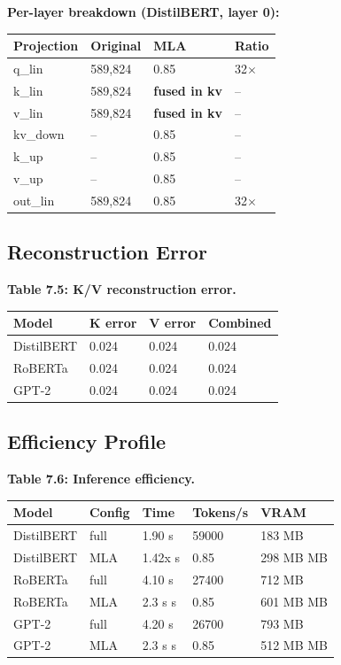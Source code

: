 \textbf{Per-layer breakdown (DistilBERT, layer 0):}

\begin{table}[H]
\centering
\small
\begin{tabular}{llll}
\toprule
\textbf{Projection} & \textbf{Original} & \textbf{MLA} & \textbf{Ratio} \\
\midrule
q\_lin & 589,824 & 0.85 & 32$\times$ \\
k\_lin & 589,824 & \textbf{fused in kv} & -- \\
v\_lin & 589,824 & \textbf{fused in kv} & -- \\
kv\_down & -- & 0.85 & -- \\
k\_up & -- & 0.85 & -- \\
v\_up & -- & 0.85 & -- \\
out\_lin & 589,824 & 0.85 & 32$\times$ \\
\bottomrule
\end{tabular}
\end{table}

\subsection{Reconstruction Error}

\textbf{Table 7.5: K/V reconstruction error.}

\begin{table}[H]
\centering
\small
\begin{tabular}{llll}
\toprule
\textbf{Model} & \textbf{K error} & \textbf{V error} & \textbf{Combined} \\
\midrule
DistilBERT & 0.024 & 0.024 & 0.024 \\
RoBERTa & 0.024 & 0.024 & 0.024 \\
GPT-2 & 0.024 & 0.024 & 0.024 \\
\bottomrule
\end{tabular}
\end{table}

\subsection{Efficiency Profile}

\textbf{Table 7.6: Inference efficiency.}

\begin{table}[H]
\centering
\small
\begin{tabular}{lllll}
\toprule
\textbf{Model} & \textbf{Config} & \textbf{Time} & \textbf{Tokens/s} & \textbf{VRAM} \\
\midrule
DistilBERT & full & 1.90 s & 59000 & 183 MB \\
DistilBERT & MLA & 1.42x s & 0.85 & 298 MB MB \\
RoBERTa & full & 4.10 s & 27400 & 712 MB \\
RoBERTa & MLA & 2.3 s s & 0.85 & 601 MB MB \\
GPT-2 & full & 4.20 s & 26700 & 793 MB \\
GPT-2 & MLA & 2.3 s s & 0.85 & 512 MB MB \\
\bottomrule
\end{tabular}
\end{table}

